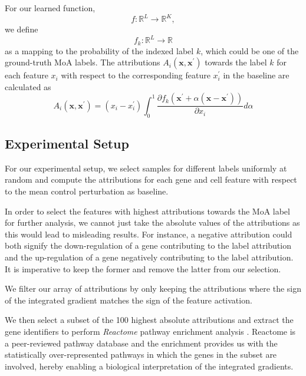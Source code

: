\documentclass[bsc,frontabs,twoside,singlespacing,parskip,deptreport]{infthesis}     %
\let\Oldsubsection\subsection
\renewcommand{\subsection}{\FloatBarrier\Oldsubsection}
\begin{document}
For our learned function, \[f: \mathbb{R}^{L} \rightarrow \mathbb{R}^{K},\] we define \[f_{k}: \mathbb{R}^{L} \rightarrow \mathbb{R}\] as a mapping to the probability of the indexed label \(k\), which could be one of the ground-truth MoA labels. The attributions \(A_{i}\left(\mathbf{x}, \mathbf{x}^{\prime}\right)\) towards the label \(k\) for each feature \(x_{i}\) with respect to the corresponding feature \(x_{i}^{\prime}\) in the baseline are calculated as
\[ A_{i}\left(\mathbf{x}, \mathbf{x}^{\prime}\right)=\left(x_{i}-x_{i}^{\prime}\right) \int_{0}^{1} \frac{\partial f_{k}\left(\mathbf{x}^{\prime}+\alpha\left(\mathbf{x}-\mathbf{x}^{\prime}\right)\right)}{\partial x_{i}} d \alpha \]

\subsection{Experimental Setup}
For our experimental setup, we select samples for different labels uniformly at random and compute the attributions for each gene and cell feature with respect to the mean control perturbation as baseline.

In order to select the features with highest attributions towards the MoA label for further analysis, we cannot just take the absolute values of the attributions as this would lead to misleading results. For instance, a negative attribution could both signify the down-regulation of a gene contributing to the label attribution and the up-regulation of a gene negatively contributing to the label attribution. It is imperative to keep the former and remove the latter from our selection.

We filter our array of attributions by only keeping the attributions where the sign of the integrated gradient matches the sign of the feature activation.

We then select a subset of the 100 highest absolute attributions and extract the gene identifiers to perform \textit{Reactome} pathway enrichment analysis \cite{fabregat_reactome_2017}. Reactome is a peer-reviewed pathway database and the enrichment provides us with the statistically over-represented pathways in which the genes in the subset are involved, hereby enabling a biological interpretation of the integrated gradients.
\end{document}

